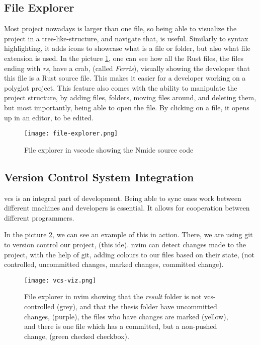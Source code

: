 \subsection{File Explorer}

Most project nowadays is larger than one file, so being able to visualize the
project in a tree-like-structure, and navigate that, is useful. Similarly to
syntax highlighting, it adds icons to showcase what is a file or folder, but
also what file extension is used. In the picture \ref{pic:fileEx}, one can see
how all the Rust files, the files ending with \textit{rs}, have a crab, (called
\textit{Ferris}), visually showing the developer that this file is a Rust source
file. This makes it easier for a developer working on a polyglot project. This
feature also comes with the ability to manipulate the project structure, by
adding files, folders, moving files around, and deleting them, but most
importantly, being able to open the file. By clicking on a file, it opens up in
an editor, to be edited.

\begin{figure}
  \centering
  \texttt{[image: file-explorer.png]}
  \caption{File explorer in \gls{vscode} showing the Nmide source code}
  \label{pic:fileEx}
\end{figure}

\subsection{Version Control System Integration}

\gls{vcs} is an integral part of development. Being able to sync ones work
between different machines and developers is essential. It allows for
cooperation between different programmers.

In the picture \ref{pic:vcsViz}, we can see an example of this in action. There,
we are using \gls{git} to version control our project, (this \gls{ide}).
\gls{nvim} can detect changes made to the project, with the help of \gls{git},
adding colours to our files based on their state, (not controlled, uncommitted
changes, marked changes, committed change).

\begin{figure}
  \centering
  \texttt{[image: vcs-viz.png]}
  \caption{
    File explorer in \gls{nvim} showing that the \textit{result} folder is
    not \gls{vcs}-controlled (grey), and that the thesis folder have uncommitted
    changes, (purple), the files who have changes are marked (yellow), and there
    is one file which has a committed, but a non-pushed change, (green checked
    checkbox).
  }
  \label{pic:vcsViz}
\end{figure}

